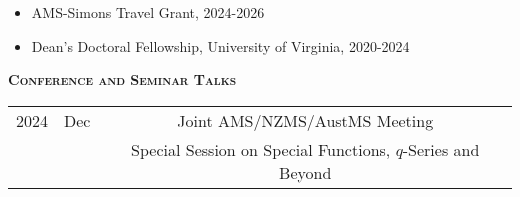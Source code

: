 \documentclass[11pt]{amsart}
\theoremstyle{remark}
\begin{document}
{{{\begin{itemize}
\item AMS-Simons Travel Grant, 2024-2026
\item Dean's Doctoral Fellowship, University of Virginia, 2020-2024
\end{itemize}

\vspace{.1in}

\large{\textbf{\textsc{Conference and Seminar Talks}}}


 
\bgroup
\def\arraystretch{1.6}
\begin{tabular}{ c c c }
2024 & Dec & \hspace{-3.45in} Joint AMS/NZMS/AustMS Meeting \\
&& \hspace{-1.89in} Special Session on Special Functions, $q$-Series and Beyond\\


\end{tabular}}}}
\end{document}
